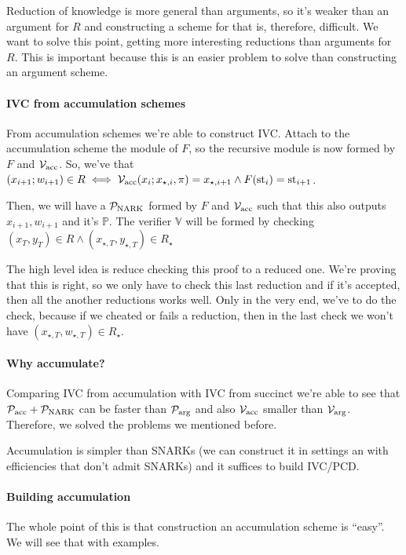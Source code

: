   Reduction of knowledge is more general than arguments, so it's weaker than an argument 
  for $R$ and constructing a scheme for that is, therefore, difficult.
  We want to solve this point, getting more interesting reductions than 
  arguments for $R$.
  This is important because this is an easier problem to solve than constructing an argument 
  scheme.

  \paragraph{IVC from accumulation schemes}
  From accumulation schemes we're able to construct IVC.
  Attach to the accumulation scheme the module of $F$, so the recursive module is now 
  formed by $F$ and $\mathcal{V}_{\text{acc}}$.
  So, we've that $(x_{i+1};w_{i+1}) \in R \iff \mathcal{V}_{\text{acc}}(x_i;x_{\star,i},\pi) = x_{\star,i+1} \land F(\text{st}_i) = \text{st}_{i+1}$.
  
  Then, we will have a $\mathcal{P}_{\text{NARK}}$ formed by $F$ and $\mathcal{V}_{\text{acc}}$ such that this 
  also outputs $x_{i+1}, w_{i+1}$ and it's $\mathbb{P}$.
  The verifier $\mathbb{V}$ will be formed by checking $(x_T,y_T) \in R \land (x_{\star,T},y_{\star,T}) \in R_\star$

  The high level idea is reduce checking this proof to a reduced one.
  We're proving that this is right, so we only have to check this last reduction and if 
  it's accepted, then all the another reductions works well.
  Only in the very end, we've to do the check, because if we cheated or fails a reduction, then in 
  the last check we won't have $(x_{\star,T},w_{\star,T}) \in R_\star$.

  \paragraph{Why accumulate?}
  Comparing IVC from accumulation with IVC from succinct we're able to see that 
  $\mathcal{P}_{\text{acc}} + \mathcal{P}_{\text{NARK}}$ can be faster than $\mathcal{P}_{\text{arg}}$ and also 
  $\mathcal{V}_{\text{acc}}$ smaller than $\mathcal{V}_{\text{arg}}$.
  Therefore, we solved the problems we mentioned before.

  Accumulation is simpler than SNARKs (we can construct it in settings an with efficiencies
  that don't admit SNARKs) and it suffices to build IVC/PCD.

  \paragraph{Building accumulation}
  The whole point of this is that construction an accumulation scheme is ``easy''.
  We will see that with examples.

